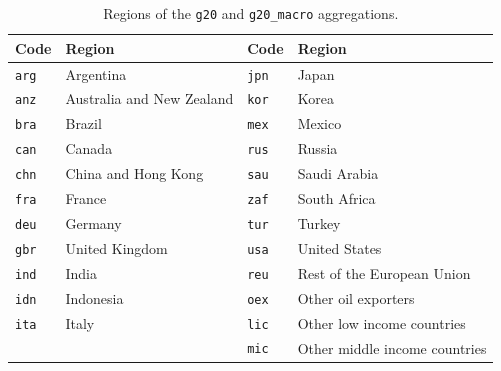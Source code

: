 \documentclass{jgea}
\begin{document}
\begin{table}[t!]
\begin{center}
\caption{Regions of the \texttt{g20} and \texttt{g20\_macro} aggregations.}\label{tab:regions}
\small
\begin{tabular}{llll}
\toprule
Code & Region & Code & Region \\
\midrule
\texttt{arg} & Argentina & \texttt{jpn} & Japan \\
\texttt{anz} & Australia and New Zealand & \texttt{kor} & Korea \\
\texttt{bra} & Brazil & \texttt{mex} & Mexico \\
\texttt{can} & Canada & \texttt{rus} & Russia \\
\texttt{chn} & China and Hong Kong & \texttt{sau} & Saudi Arabia \\
\texttt{fra} & France & \texttt{zaf} & South Africa \\
\texttt{deu} & Germany & \texttt{tur} & Turkey \\
\texttt{gbr} & United Kingdom & \texttt{usa} & United States \\
\texttt{ind} & India & \texttt{reu} & Rest of the European Union \\
\texttt{idn} & Indonesia & \texttt{oex} & Other oil exporters \\
\texttt{ita} & Italy & \texttt{lic} & Other low income countries \\
 & & \texttt{mic} & Other middle income countries \\
\bottomrule
\end{tabular}
\end{center}
\end{table}
\end{document}

